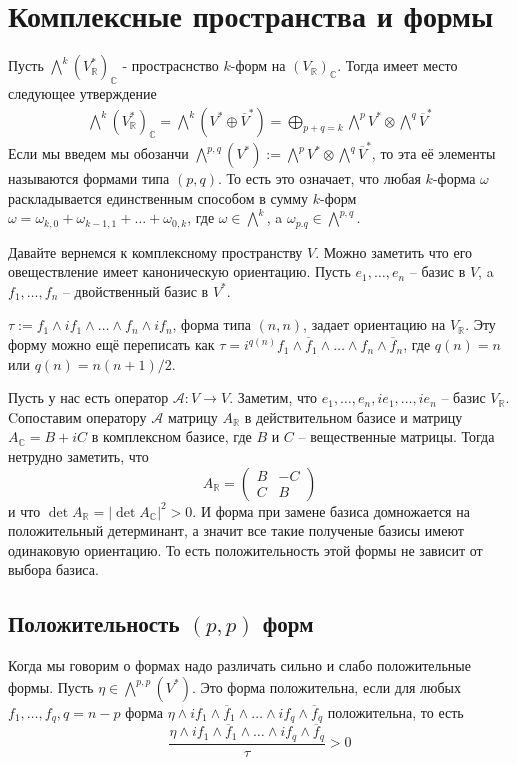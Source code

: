 \section{Комплексные пространства и формы}
Пусть $\bigwedge^k(V^*_{\mathbb R})_{\mathbb C}$ - простраснство $k$-форм на
$(V_{\mathbb R})_{\mathbb C}$. Тогда имеет место следующее утверждение
\begin{align*}
    \bigwedge^k(V^*_{\mathbb R})_{\mathbb C}=\bigwedge^k(V^*\oplus \overline V^*)=
    \bigoplus_{p+q=k}\bigwedge^p V^*\otimes\bigwedge^q\overline V^*
\end{align*}
Если мы введем мы обозанчи $\bigwedge^{p,q}(V^*):=\bigwedge^p V^*\otimes\bigwedge^q\overline V^*$,
то эта её элементы называются формами типа $(p,q)$. То есть это означает, что любая $k$-форма
$\omega$ раскладывается единственным способом в сумму $k$-форм $\omega =
\omega_{k,0}+\omega_{k-1,1}+\ldots+\omega_{0,k}$, где $\omega\in\bigwedge^k$, a
$\omega_{p.q}\in\bigwedge^{p,q}$.

Давайте вернемся к комплексному пространству $V$. Можно заметить что его
овеществление имеет каноническую ориентацию. Пусть $e_1,\ldots,e_n$ – базис в
$V$, a $f_1,\ldots,f_n$ – двойственный базис в $V^*$.

\utv $\tau:=f_1\wedge if_1\wedge\ldots\wedge f_n\wedge if_n$, форма
типа $(n,n)$, задает ориентацию на $V_{\mathbb R}$. Эту форму можно ещё переписать
как $\tau=i^{q(n)}f_1\wedge\overline f_1\wedge\ldots\wedge f_n\wedge\overline f_n$,
где $q(n)=n$ или $q(n)=n(n+1)/2$.

\doc Пусть у нас есть оператор $\mathcal A: V\rightarrow V$.
Заметим, что $e_1,\ldots,e_n,ie_1,\ldots,ie_n$ – базис $V_{\mathbb R}$. Cопоставим
оператору $\mathcal A$ матрицу $A_{\mathbb R}$ в действительном базисе и матрицу
$A_{\mathbb C}=B+iC$ в комплексном базисе, где $B$ и $C$ – вещественные матрицы.
Тогда нетрудно заметить, что
\[A_{\mathbb R}=\left(\begin{array}{cc}B&-C\\C&B\end{array}\right)\]
и что $\det A_{\mathbb R}=|\det A_{\mathbb C}|^2>0$. И форма при замене базиса
домножается на положительный детерминант, а значит все такие полученые базисы
имеют одинаковую ориентацию. То есть положительность этой формы не зависит от
выбора базиса.

\subsection{Положительность $(p,p)$ форм}
Когда мы говорим о формах надо различать сильно и слабо положительные формы.
Пусть $\eta\in\bigwedge^{p,p}(V^*)$. Это форма положительна, если для любых
$f_1,\ldots,f_q,q=n-p$ форма $\eta\wedge if_1\wedge\overline f_1\wedge\ldots
\wedge if_q\wedge\overline f_q$ положительна, то есть
\[\frac{\eta\wedge if_1\wedge\overline f_1\wedge\ldots\wedge if_q\wedge\overline f_q}{\tau}>0\]

